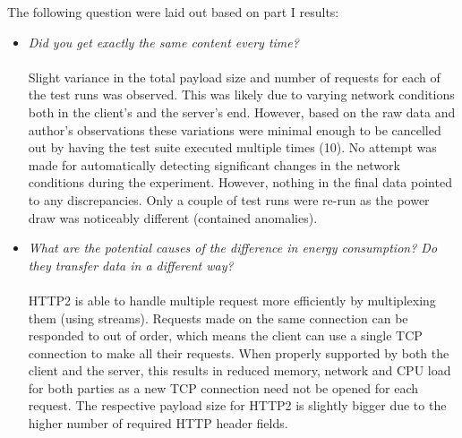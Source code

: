 \documentclass{article}
\begin{document}
The following question were laid out based on part I results:
\\
\begin{itemize}[label={}]
    \item \emph{Did you get exactly the same content every time?}\\\\
    Slight variance in the total payload size and number of requests for each of the test runs was observed. This was likely due to varying network conditions both in the client's and the server's end. However, based on the raw data and author's observations these variations were minimal enough to be cancelled out by having the test suite executed multiple times (10). No attempt was made for automatically detecting significant changes in the network conditions during the experiment. However, nothing in the final data pointed to any discrepancies. Only a couple of test runs were re-run as the power draw was noticeably different (contained anomalies).\\

    \item \emph{What are the potential causes of the difference in energy consumption? Do they transfer data in a different way?}\\\\
    HTTP2 is able to handle multiple request more efficiently by multiplexing them (using streams). Requests made on the same connection can be responded to out of order, which means the client can use a single TCP connection to make all their requests. When properly supported by both the client and the server, this results in reduced memory, network and CPU load for both parties as a new TCP connection need not be opened for each request. The respective payload size for HTTP2 is slightly bigger due to the higher number of required HTTP header fields.\\
\end{itemize}
\end{document}
